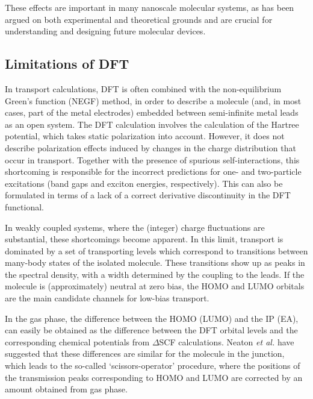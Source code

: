 \documentclass[aip,jcp,a4paper,reprint,floatfix,superscriptaddress]{revtex4-1}
\newcommand{\etal}{\emph{et al.}\xspace}
\begin{document}
These effects are important in many nanoscale molecular systems, as has been argued on both experimental\cite{Kubatkin2003,Hedegaard2005,Bruot2012} and theoretical grounds \cite{Neaton2006,Quek2007,Mowbray2008,Kaasbjerg2008,Hybertsen2008,Thygesen2009} and are crucial for understanding and designing future molecular devices.

\subsection{Limitations of DFT}

In transport calculations, DFT is often combined with the non-equilibrium Green's function (NEGF) method, in order to describe a molecule (and, in most cases, part of the metal electrodes) embedded between semi-infinite metal leads as an open system.\cite{Brandbyge2002,Stokbro2003a,Rocha2006,Evers2006,Verzijl2012}
The DFT calculation involves the calculation of the Hartree potential, which takes static polarization into account. However, it does not describe polarization effects induced by changes in the charge distribution that occur in transport. Together with the presence of spurious self-interactions,\cite{Perdew1981} this shortcoming is responsible for the incorrect predictions for one- and two-particle excitations (band gaps and exciton energies, respectively). This can also be formulated in terms of a lack of a correct derivative discontinuity in the DFT functional.\cite{Perdew1982,Perdew1983} 

In weakly coupled systems, where the (integer) charge fluctuations are substantial, these shortcomings become apparent. In this limit, transport is dominated by a set of transporting levels which correspond to transitions between many-body states of the isolated molecule. These transitions show up as peaks in the spectral density, with a width determined by the coupling to the leads. If the molecule is (approximately) neutral at zero bias, the HOMO and LUMO orbitals are the main candidate channels for low-bias transport. 

In the gas phase, the difference between the HOMO (LUMO) and the IP (EA), can easily be obtained as the difference between the DFT orbital levels and the corresponding chemical potentials from $\Delta$SCF calculations.\cite{Jones1989} Neaton \etal\cite{Neaton2006} have suggested that these differences are similar for the molecule in the junction, which leads to the so-called `scissors-operator' procedure, where the positions of the transmission peaks corresponding to HOMO and LUMO are corrected by an amount obtained from gas phase. 
\end{document}
